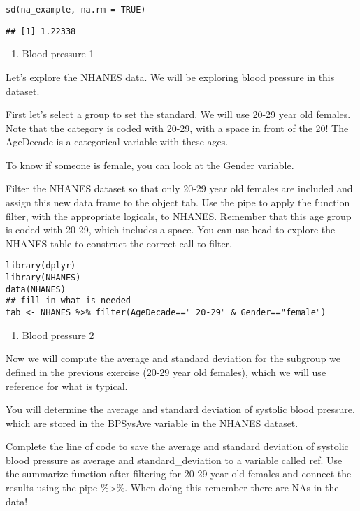 \documentclass[]{article}
\providecommand{\tightlist}{%
  \setlength{\itemsep}{0pt}\setlength{\parskip}{0pt}}
\begin{document}
\begin{verbatim}
sd(na_example, na.rm = TRUE)
\end{verbatim}

\begin{verbatim}
## [1] 1.22338
\end{verbatim}

\begin{enumerate}
\def\labelenumi{\arabic{enumi}.}
\tightlist
\item
  Blood pressure 1
\end{enumerate}

Let's explore the NHANES data. We will be exploring blood pressure in
this dataset.

First let's select a group to set the standard. We will use 20-29 year
old females. Note that the category is coded with 20-29, with a space in
front of the 20! The AgeDecade is a categorical variable with these
ages.

To know if someone is female, you can look at the Gender variable.

Filter the NHANES dataset so that only 20-29 year old females are
included and assign this new data frame to the object tab. Use the pipe
to apply the function filter, with the appropriate logicals, to NHANES.
Remember that this age group is coded with 20-29, which includes a
space. You can use head to explore the NHANES table to construct the
correct call to filter.

\begin{verbatim}
library(dplyr)
library(NHANES)
data(NHANES)
## fill in what is needed
tab <- NHANES %>% filter(AgeDecade==" 20-29" & Gender=="female")
\end{verbatim}

\begin{enumerate}
\def\labelenumi{\arabic{enumi}.}
\setcounter{enumi}{1}
\tightlist
\item
  Blood pressure 2
\end{enumerate}

Now we will compute the average and standard deviation for the subgroup
we defined in the previous exercise (20-29 year old females), which we
will use reference for what is typical.

You will determine the average and standard deviation of systolic blood
pressure, which are stored in the BPSysAve variable in the NHANES
dataset.

Complete the line of code to save the average and standard deviation of
systolic blood pressure as average and standard\_deviation to a variable
called ref. Use the summarize function after filtering for 20-29 year
old females and connect the results using the pipe \%\textgreater{}\%.
When doing this remember there are NAs in the data!
\end{document}

